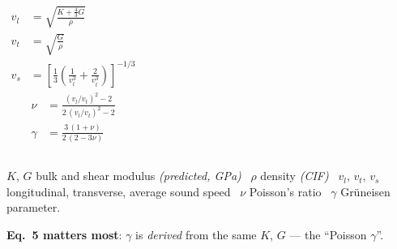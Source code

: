 \documentclass[aspectratio=169]{beamer}
\begin{document}
\begin{frame}

\begin{columns}[T]
{\small
\begin{align}
v_l &= \sqrt{\frac{K + \tfrac{4}{3}G}{\rho}} \\[1pt]
v_t &= \sqrt{\frac{G}{\rho}} \\[1pt]
v_s &= \left[\frac{1}{3}\left(\frac{1}{v_l^{3}} + \frac{2}{v_t^{3}}\right)\right]^{-1/3}
\end{align}}
{\small
\begin{align}
\nu &= \frac{(v_l/v_t)^2 - 2}{2\,(v_l/v_t)^2 - 2} \\[1pt]
\gamma &= \frac{3\,(1 + \nu)}{2\,(2 - 3\nu)}
\end{align}}
\end{columns}

\vspace{2pt}
{\sffamily\scriptsize
$K$, $G$ bulk and shear modulus \emph{(predicted, GPa)} \textperiodcentered\
$\rho$ density \emph{(CIF)} \textperiodcentered\ $v_l$, $v_t$, $v_s$
longitudinal, transverse, average sound speed \textperiodcentered\ $\nu$
Poisson's ratio \textperiodcentered\ $\gamma$ Gr\"uneisen parameter.

\vspace{3pt}
\textbf{Eq.~5 matters most}: $\gamma$ is \emph{derived} from the same $K$, $G$
--- the ``Poisson $\gamma$''.\par}
\end{frame}
\end{document}
